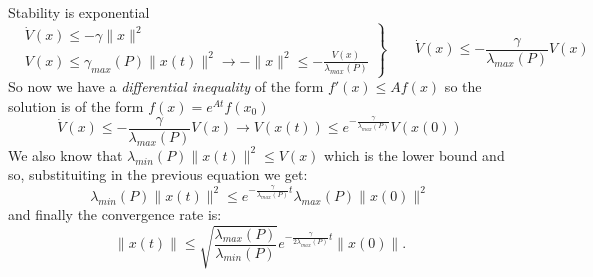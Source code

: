 \begin{remark}
	Stability is exponential
\[
\left.
\begin{aligned}
	& \dot{V}(x)\le-\gamma \|x\|^2\\
	& V(x)\le \gamma_{max}(P)\|x(t)\|^2\to -\|x\|^2 \le-\frac{V(x)}{\lambda_{max}(P)}	
\end{aligned}
\right\rbrace\qquad	\dot{V}(x)\le -\frac{\gamma}{\lambda_{max}(P)}V(x)
\]
So now we have a \emph{differential inequality} of the form \emph{$f'(x)\le Af(x)$} so the solution is of the form $f(x)=e^{At}f(x_0)$
\[
\dot{V}(x)\le -\frac{\gamma}{\lambda_{max}(P)}V(x)\longrightarrow V(x(t))\le e^{-\frac{\gamma}{\lambda_{max}(P)}}V(x(0))
\]
We also know that $\lambda_{min}(P)\|x(t)\|^2\le V(x)$ which is the lower bound and so, substituiting in the previous equation we get:
\[
\lambda_{min}(P)\|x(t)\|^2\le e^{-\frac{\gamma}{\lambda_{max}(P)}t}\lambda_{max}(P)\|x(0)\|^2
\]
and finally the convergence rate is:
\[
\|x(t)\|\le \sqrt{\frac{\lambda_{max}(P)}{\lambda_{min}(P)}}e^{-\frac{\gamma}{2\lambda_{max}(P)}t}\|x(0)\|.
\]
\end{remark}
